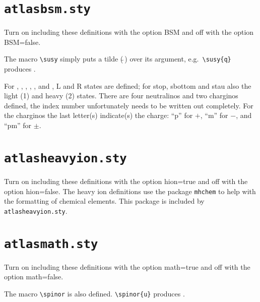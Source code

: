 \documentclass[UKenglish,texlive=2014]{latex/atlasdoc}
\newcommand{\File}[1]{\texttt{#1}\xspace}
\newcommand{\Macro}[1]{\texttt{\textbackslash #1}\xspace}
\newcommand{\Option}[1]{\textsf{#1}\xspace}
\newcommand{\Package}[1]{\texttt{#1}\xspace}
\begin{document}
{\newpage
\section{\File{atlasbsm.sty}}

Turn on including these definitions with the option \Option{BSM} and off with the option \Option{BSM=false}.

The macro \Macro{susy} simply puts a tilde ($\tilde{\ }$) over its argument,
e.g.\ \verb|\susy{q}| produces .

For , , , \slepton, \sel, \smu and
\stau, L and R states are defined; for stop, sbottom and stau also the
light (1) and heavy (2) states.
There are four neutralinos and two charginos defined, 
the index number unfortunately needs to be written out completely. 
For the charginos the last letter(s) indicate(s) the charge: 
\enquote{p} for $+$, \enquote{m} for $-$, and \enquote{pm} for $\pm$.




\newpage
\section{\File{atlasheavyion.sty}}

Turn on including these definitions with the option \Option{hion=true} and off with the option \Option{hion=false}.
The heavy ion definitions use the package \Package{mhchem} to help with the formatting of chemical elements.
This package is included by \File{atlasheavyion.sty}.



%
%


\newpage
\section{\File{atlasmath.sty}}

Turn on including these definitions with the option \Option{math=true} and off with the option \Option{math=false}.



\noindent The macro \Macro{spinor} is also defined.
\verb|\spinor{u}| produces .


}
\end{document}
